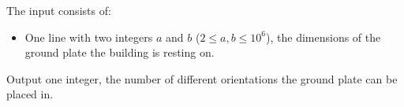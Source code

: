 \begin{Input}
  The input consists of:
  \begin{itemize}
    \item One line with two integers $a$ and $b$ ($2 \le a,b \le 10^6$), the
		dimensions of the ground plate the building is resting on.
  \end{itemize}
\end{Input}

\begin{Output}
  Output one integer, the number of different orientations the ground plate can
  be placed in.
\end{Output}
